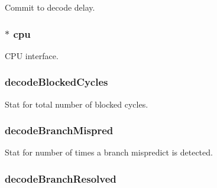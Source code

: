 \label{classDefaultDecode_a77f4b17f2ef6c226e894d648ee743fae}
Commit to decode delay. \hypertarget{classDefaultDecode_a1379cf882a12ac6fc9eba5da7c84b18b}{
\subsubsection[{cpu}]{$\ast$ {\bf cpu}}}
\label{classDefaultDecode_a1379cf882a12ac6fc9eba5da7c84b18b}
CPU interface. \hypertarget{classDefaultDecode_aa61ef46bfb5ece8742ca0ba35c596f7f}{
\subsubsection[{decodeBlockedCycles}]{ {\bf decodeBlockedCycles}}}
\label{classDefaultDecode_aa61ef46bfb5ece8742ca0ba35c596f7f}
Stat for total number of blocked cycles. \hypertarget{classDefaultDecode_ac82a9e3870dbcc3d3c3a331634bf81af}{
\subsubsection[{decodeBranchMispred}]{ {\bf decodeBranchMispred}}}
\label{classDefaultDecode_ac82a9e3870dbcc3d3c3a331634bf81af}
Stat for number of times a branch mispredict is detected. \hypertarget{classDefaultDecode_a85271ddee50df718b95448a65de49f4f}{
\subsubsection[{decodeBranchResolved}]{ {\bf decodeBranchResolved}}}
